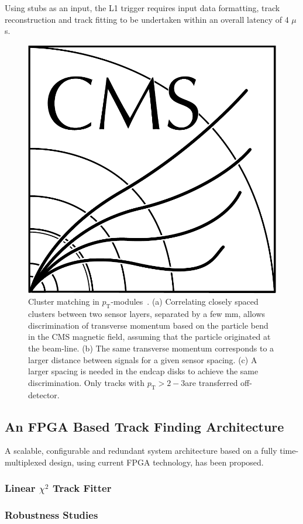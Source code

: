 Using stubs as an input, the L1 trigger requires input data formatting, track reconstruction and track fitting to be undertaken within an overall latency of 4 $\mu$s.  

\begin{figure}[!h]
\centering
\includegraphics[width=5in]{CMS-bw-logo.pdf}
\caption{Cluster matching in $p_\mathrm{T}$-modules~\cite{P2TrackerTDR}. (a) Correlating closely spaced clusters between two sensor layers, separated by a few mm, allows discrimination of transverse momentum based on the particle bend in the CMS magnetic field, assuming that the particle originated at the beam-line. (b) The same transverse momentum corresponds to a larger distance between signals for a given sensor spacing. (c) A larger spacing is needed in the endcap disks to achieve the same discrimination. Only tracks with $p_{\mathrm{T}}>2-3$\GeVc are transferred off-detector.
}
\label{stubs}
\end{figure}

\subsection{An FPGA Based Track Finding Architecture}

A scalable, configurable and redundant system architecture based on a fully time-multiplexed design, using current FPGA technology, has been proposed.

\subsubsection{Linear $\chi^{2}$ Track Fitter}

\subsubsection{Robustness Studies}
